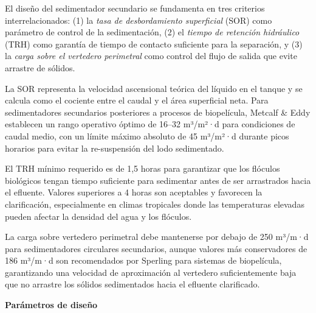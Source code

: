 \documentclass[12pt,a4paper]{article}
\begin{document}
El diseño del sedimentador secundario se fundamenta en tres criterios interrelacionados: (1) la \textit{tasa de desbordamiento superficial} (SOR) como parámetro de control de la sedimentación, (2) el \textit{tiempo de retención hidráulico} (TRH) como garantía de tiempo de contacto suficiente para la separación, y (3) la \textit{carga sobre el vertedero perimetral} como control del flujo de salida que evite arrastre de sólidos.

La SOR representa la velocidad ascensional teórica del líquido en el tanque y se calcula como el cociente entre el caudal y el área superficial neta. Para sedimentadores secundarios posteriores a procesos de biopelícula, Metcalf \& Eddy \cite{metcalf2014} establecen un rango operativo óptimo de 16--32 m³/m²·d para condiciones de caudal medio, con un límite máximo absoluto de 45 m³/m²·d durante picos horarios para evitar la re-suspensión del lodo sedimentado.

El TRH mínimo requerido es de 1,5 horas para garantizar que los flóculos biológicos tengan tiempo suficiente para sedimentar antes de ser arrastrados hacia el efluente. Valores superiores a 4 horas son aceptables y favorecen la clarificación, especialmente en climas tropicales donde las temperaturas elevadas pueden afectar la densidad del agua y los flóculos.

La carga sobre vertedero perimetral debe mantenerse por debajo de 250 m³/m·d para sedimentadores circulares secundarios, aunque valores más conservadores de 186 m³/m·d son recomendados por Sperling \cite{sperling2007} para sistemas de biopelícula, garantizando una velocidad de aproximación al vertedero suficientemente baja que no arrastre los sólidos sedimentados hacia el efluente clarificado.

\textbf{Parámetros de diseño}
\end{document}

